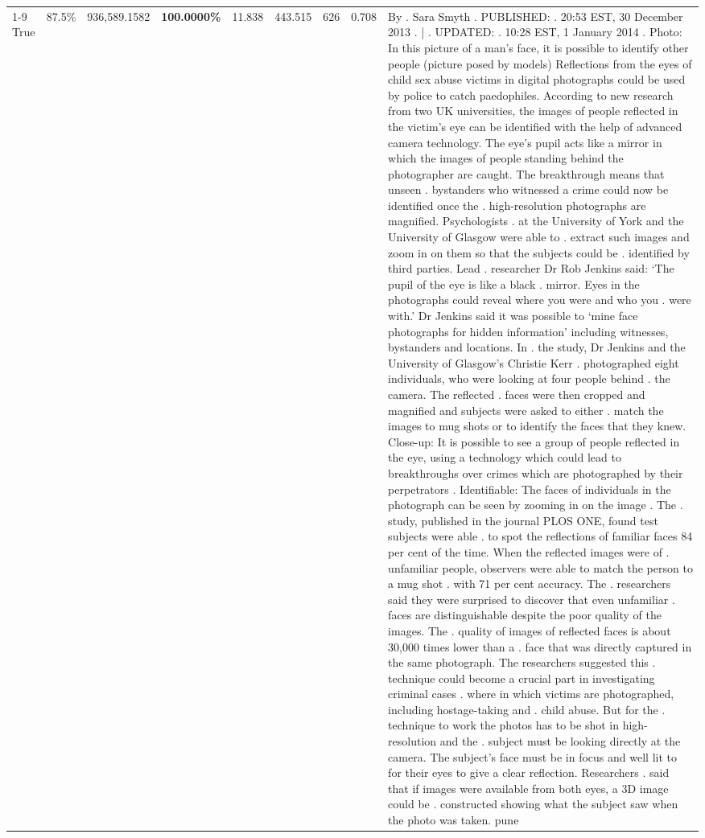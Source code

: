 \begin{table}[H]
\begin{tabular}{lllrlllll}
\cline{1-9}
True & 87.5\% & 936,589.1582 & \bfseries \color{red} 100.0000\% & 11.838 & 443.515 & 626 & 0.708 & By . Sara Smyth . PUBLISHED: . 20:53 EST, 30 December 2013 . | . UPDATED: . 10:28 EST, 1 January 2014 . Photo: In this picture of a man's face, it is possible to identify other people (picture posed by models) Reflections from the eyes of child sex abuse victims in digital photographs could be used by police to catch paedophiles. According to new research from two UK universities, the images of people reflected in the victim's eye can be identified with the help of advanced camera technology. The eye's pupil acts like a mirror in which the images of people standing behind the photographer are caught. The breakthrough means that unseen . bystanders who witnessed a crime could now be identified once the . high-resolution photographs are magnified. Psychologists . at the University of York and the University of Glasgow were able to . extract such images and zoom in on them so that the subjects could be . identified by third parties. Lead . researcher Dr Rob Jenkins said: ‘The pupil of the eye is like a black . mirror. Eyes in the photographs could reveal where you were and who you . were with.' Dr Jenkins said it was possible to ‘mine face photographs for hidden information' including witnesses, bystanders and locations. In . the study, Dr Jenkins and the University of Glasgow's Christie Kerr . photographed eight individuals, who were looking at four people behind . the camera. The reflected . faces were then cropped and magnified and subjects were asked to either . match the images to mug shots or to identify the faces that they knew. Close-up: It is possible to see a group of people reflected in the eye, using a technology which could lead to breakthroughs over crimes which are photographed by their perpetrators . Identifiable: The faces of individuals in the photograph can be seen by zooming in on the image . The . study, published in the journal PLOS ONE, found test subjects were able . to spot the reflections of familiar faces 84 per cent of the time. When the reflected images were of . unfamiliar people, observers were able to match the person to a mug shot . with 71 per cent accuracy. The . researchers said they were surprised to discover that even unfamiliar . faces are distinguishable despite the poor quality of the images. The . quality of images of reflected faces is about 30,000 times lower than a . face that was directly captured in the same photograph. The researchers suggested this . technique could become a crucial part in investigating criminal cases . where in which victims are photographed, including hostage-taking and . child abuse. But for the . technique to work the photos has to be shot in high-resolution and the . subject must be looking directly at the camera. The subject's face must be in focus and well lit to for their eyes to give a clear reflection. Researchers . said that if images were available from both eyes, a 3D image could be . constructed showing what the subject saw when the photo was taken. pune \\

\end{tabular}
\end{table}

